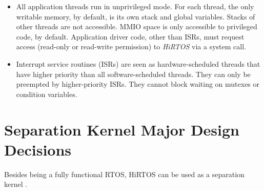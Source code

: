 \documentclass[11pt,letterpaper,twoside,openany]{book}
\begin{document}
\begin{itemize}
\item
All application threads run in unprivileged mode. For each thread, the only writable memory,
by default, is its own stack and global variables. Stacks of other threads are not accessible.
MMIO space is only accessible to privileged code, by default. Application driver code, other
than ISRs, must request access (read-only or read-write permission) to \emph{HiRTOS} via a
system call.

\item Interrupt service routines (ISRs) are seen as hardware-scheduled threads that have higher priority than all
software-scheduled threads. They can only be preempted by higher-priority ISRs.
They cannot block waiting on mutexes or condition variables.

\end{itemize}

\section{Separation Kernel Major Design Decisions}

Besides being a fully functional RTOS, HiRTOS can be used as a separation kernel \cite{SepK}.
\end{document}

